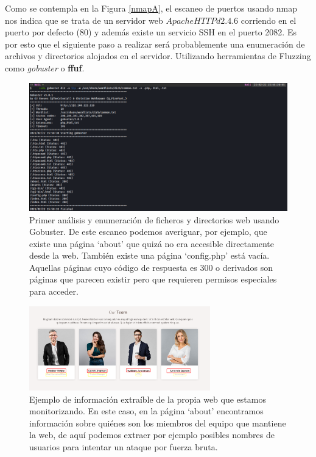 Como se contempla en la Figura \ref{nmapA}, el escaneo de puertos usando nmap nos indica que se trata de un servidor web $Apache HTTPd 2.4.6$ corriendo en el puerto por defecto (80) y además existe un servicio SSH en el puerto 2082. Es por esto que el siguiente paso a realizar será probablemente una enumeración de archivos y directorios alojados en el servidor. Utilizando herramientas de Fluzzing como \textit{gobuster} o \textbf{ffuf}.


\begin{figure}[!hbt]
  \centering
  \label{gobuster1}
  \includegraphics[width=\textwidth]{imagenes/gobuster1.png}
  \caption{Primer análisis y enumeración de ficheros y directorios web usando Gobuster. De este escaneo podemos averiguar, por ejemplo, que existe una página `about' que quizá no era accesible directamente desde la web. También existe una página `config.php' está vacía. Aquellas páginas cuyo código de respuesta es 300 o derivados son páginas que parecen existir pero que requieren permisos especiales para acceder.}
\end{figure}

\begin{figure}[!hbt]
  \centering
  \includegraphics[width=0.7\textwidth]{imagenes/team.png}
  \caption{Ejemplo de información extraíble de la propia web que estamos monitorizando. En este caso, en la página `about' encontramos información sobre quiénes son los miembros del equipo que mantiene la web, de aquí podemos extraer por ejemplo posibles nombres de usuarios para intentar un ataque por fuerza bruta.}
   \label{info_web2}
\end{figure}


